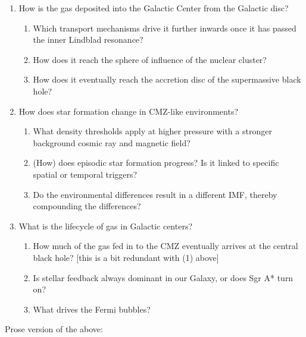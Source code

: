 \documentclass{aastex62}
\begin{document}
\begin{enumerate}
    \item How is the gas deposited into the Galactic Center from the Galactic disc?
    \begin{enumerate}
        \item Which transport mechanisms drive it further inwards once it has passed the inner Lindblad resonance?
        \item How does it reach the sphere of influence of the nuclear cluster?
        \item How does it eventually reach the accretion disc of the supermassive black hole?
    \end{enumerate}
    \item How does star formation change in CMZ-like environments?
        \begin{enumerate}
            \item What density thresholds apply at higher pressure with a stronger background cosmic ray and magnetic field?
            \item (How) does episodic star formation progress?  Is it linked to specific spatial or temporal triggers?
            \item Do the environmental differences result in a different IMF, thereby compounding the differences?
        \end{enumerate}
    \item What is the lifecycle of gas in Galactic centers?
        \begin{enumerate}
            \item How much of the gas fed in to the CMZ eventually arrives at the central black hole? [this is a bit redundant with (1) above]
            \item Is stellar feedback always dominant in our Galaxy, or does Sgr A* turn on?
            \item What drives the Fermi bubbles?
        \end{enumerate}
\end{enumerate}

Prose version of the above:
\end{document}
